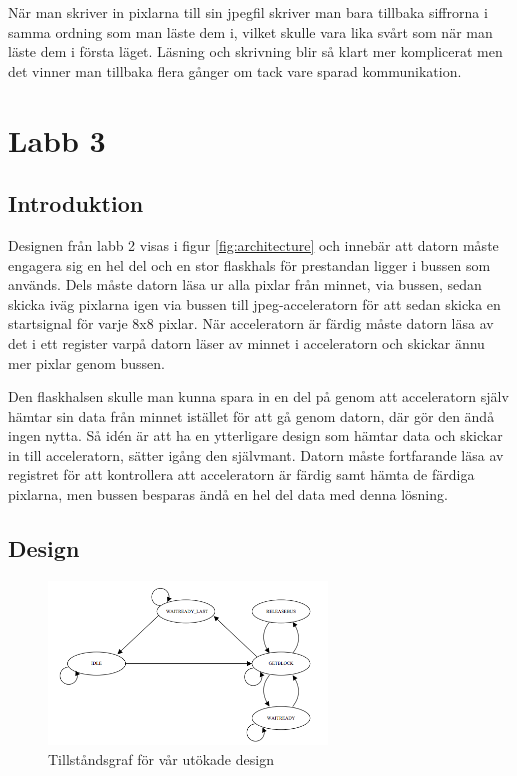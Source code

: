 \documentclass[a4paper]{article}
\begin{document}
När man skriver in pixlarna till sin jpegfil skriver man bara tillbaka
siffrorna i samma ordning som man läste dem i, vilket skulle vara lika
svårt som när man läste dem i första läget. Läsning och skrivning blir
så klart mer komplicerat men det vinner man tillbaka flera gånger om
tack vare sparad kommunikation.

\section{Labb 3}
\subsection{Introduktion}

Designen från labb 2 visas i figur \ref{fig:architecture} och innebär
att datorn måste engagera sig en hel del och en stor flaskhals för
prestandan ligger i bussen som används. Dels måste datorn läsa ur alla
pixlar från minnet, via bussen, sedan skicka iväg pixlarna igen via
bussen till jpeg-acceleratorn för att sedan skicka en startsignal för
varje 8x8 pixlar. När acceleratorn är färdig måste datorn läsa av det i
ett register varpå datorn läser av minnet i acceleratorn och skickar
ännu mer pixlar genom bussen.

Den flaskhalsen skulle man kunna spara in en del på genom att
acceleratorn själv hämtar sin data från minnet istället för att gå genom
datorn, där gör den ändå ingen nytta. Så idén är att ha en ytterligare
design som hämtar data och skickar in till acceleratorn, sätter igång
den självmant. Datorn måste fortfarande läsa av registret för att
kontrollera att acceleratorn är färdig samt hämta de färdiga pixlarna,
men bussen besparas ändå en hel del data med denna lösning.

\subsection{Design}
\begin{figure}[h]
\centering
\includegraphics[width=280px]{fsmlab3.png}
\caption{Tillståndsgraf för vår utökade design}
\label{fig:state}
\end{figure}
\end{document}

